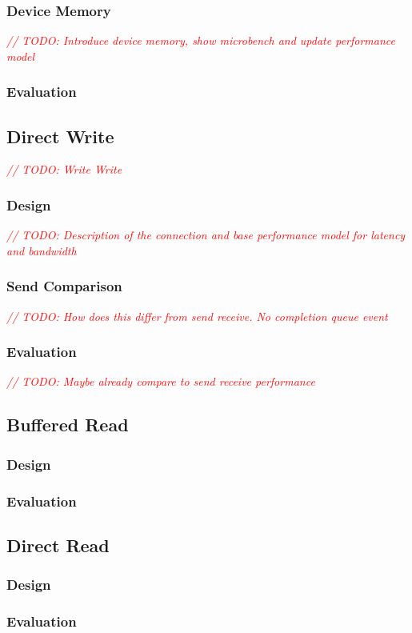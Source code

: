 \documentclass{article}
\newcommand{\todo}[1]{\textit{\textcolor{red}{// TODO: #1} }}
\theoremstyle{plain}
\theoremstyle{definition}
\theoremstyle{remark}
\begin{document}
\subsubsection{Device Memory}
\todo{Introduce device memory, show microbench and update performance model}
\subsubsection{Evaluation}

\pagebreak
\subsection{Direct Write}
\todo{Write Write}
\subsubsection{Design}
\todo{Description of the connection and base performance model for latency and bandwidth}
\subsubsection{Send Comparison}
\todo{How does this differ from send receive. No completion queue event}
\subsubsection{Evaluation}
\todo{Maybe already compare to send receive performance}

\pagebreak
\subsection{Buffered Read}
\subsubsection{Design}
\subsubsection{Evaluation}

\pagebreak
\subsection{Direct Read}
\subsubsection{Design}
\subsubsection{Evaluation}
\end{document}
